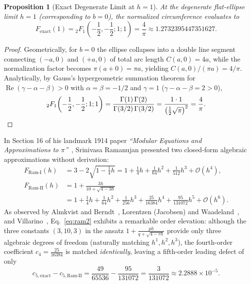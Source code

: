 \documentclass[11pt,a4paper]{article}
\theoremstyle{spacious}
\newtheorem{proposition}[theorem]{Proposition}
\theoremstyle{spaciousdef}
\begin{document}
\begin{proposition}[Exact Degenerate Limit at $h=1$]\label{prop:h1_limit}
At the degenerate flat-ellipse limit $h = 1$ (corresponding to $b = 0$), the normalized circumference evaluates to
\begin{equation}\label{eq:four_over_pi}
F_{\text{exact}}(1) = {}_2F_1\!\left(-\frac{1}{2}, -\frac{1}{2}; 1; 1\right) = \frac{4}{\pi} \approx 1.2732395447351627.
\end{equation}
\end{proposition}
\begin{proof}
Geometrically, for $b = 0$ the ellipse collapses into a double line segment connecting $(-a, 0)$ and $(+a, 0)$ of total arc length $C(a, 0) = 4a$, while the normalization factor becomes $\pi(a + 0) = \pi a$, yielding $C(a,0)/(\pi a) = 4/\pi$. Analytically, by Gauss's hypergeometric summation theorem for $\operatorname{Re}(\gamma - \alpha - \beta) > 0$ with $\alpha = \beta = -1/2$ and $\gamma = 1$ ($\gamma - \alpha - \beta = 2 > 0$),
\[
{}_2F_1\!\left(-\frac{1}{2}, -\frac{1}{2}; 1; 1\right) = \frac{\Gamma(1)\,\Gamma(2)}{\Gamma(3/2)\,\Gamma(3/2)} = \frac{1 \cdot 1}{\left(\frac{1}{2}\sqrt{\pi}\right)^2} = \frac{4}{\pi}. \qedhere
\]
\end{proof}

In Section 16 of his landmark 1914 paper \emph{``Modular Equations and Approximations to $\pi$''}~\cite{Ramanujan1914}, Srinivasa Ramanujan presented two closed-form algebraic approximations without derivation:
\begin{align}
F_{\text{Ram-I}}(h) &= 3 - 2\sqrt{1 - \frac{1}{4}h} = 1 + \frac{1}{4}h + \frac{1}{64}h^2 + \frac{1}{512}h^3 + \mathcal{O}(h^4), \label{eq:ram1}\\
F_{\text{Ram-II}}(h) &= 1 + \frac{3h}{10 + \sqrt{4 - 3h}} \nonumber\\
&= 1 + \frac{1}{4}h + \frac{1}{64}h^2 + \frac{1}{256}h^3 + \frac{25}{16384}h^4 + \frac{95}{131072}h^5 + \mathcal{O}(h^6). \label{eq:ram2}
\end{align}
As observed by Almkvist and Berndt~\cite{AlmkvistBerndt1988}, Lorentzen (Jacobsen) and Waadeland~\cite{JacobsenWaadeland1985,LorentzenWaadeland1992}, and Villarino~\cite{Villarino2005}, Eq.~\eqref{eq:ram2} exhibits a remarkable order elevation: although the three constants $(3, 10, 3)$ in the ansatz $1 + \tfrac{p h}{q + \sqrt{4 - r h}}$ provide only three algebraic degrees of freedom (naturally matching $h^1, h^2, h^3$), the fourth-order coefficient $c_4 = \tfrac{25}{16384}$ is matched \emph{identically}, leaving a fifth-order leading defect of only
\[
c_{5,\text{exact}} - c_{5,\text{Ram-II}} = \frac{49}{65536} - \frac{95}{131072} = \frac{3}{131072} \approx 2.2888 \times 10^{-5}.
\]
\end{document}
